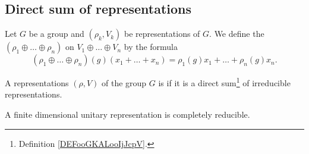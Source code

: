 \subsection{Direct sum of representations}

\begin{definition}      \label{DEFooGKALooIjJcpV}
	Let \( G\) be a group and \( (\rho_k, V_k)\) be representations of \( G\). We define the  \( (\rho_1\oplus\ldots \oplus \rho_n)\) on \( V_1\oplus\ldots \oplus V_n\) by the formula
	\begin{equation}
		(\rho_1\oplus\ldots \oplus\rho_n)(g)(x_1+\ldots +x_n)=\rho_1(g)x_1+\ldots +\rho_n(g)x_n.
	\end{equation}
\end{definition}

\begin{definition}
	A representations \( (\rho, V)\) of the group \( G\) is  if it is a direct sum\footnote{Definition \ref{DEFooGKALooIjJcpV}.} of irreducible representations.
\end{definition}

\begin{lemma}
	A finite dimensional unitary representation is completely reducible.
\end{lemma}

